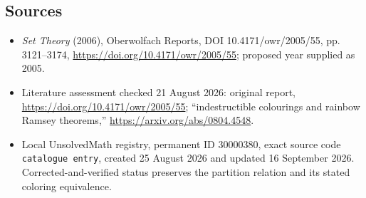 \documentclass[11pt]{article}
\begin{document}
\subsection{Sources}
\begin{itemize}
\item \emph{Set Theory} (2006), Oberwolfach Reports, DOI 10.4171/owr/2005/55, pp. 3121--3174, \url{https://doi.org/10.4171/owr/2005/55}; proposed year supplied as 2005.
\item Literature assessment checked 21 August 2026: original report, \url{https://doi.org/10.4171/owr/2005/55}; ``indestructible colourings and rainbow Ramsey theorems,'' \url{https://arxiv.org/abs/0804.4548}.
\item Local UnsolvedMath registry, permanent ID $30000380$, exact source code \texttt{catalogue entry}, created 25 August 2026 and updated 16 September 2026. Corrected-and-verified status preserves the partition relation and its stated coloring equivalence.
\end{itemize}
\end{document}
